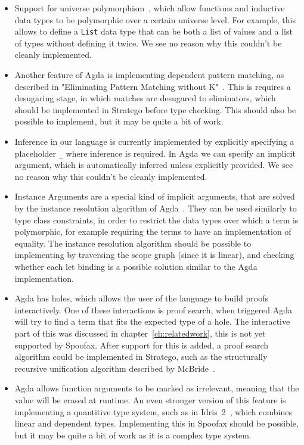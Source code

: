 \begin{itemize}
	\item Support for universe polymorphism~\cite[Universe Levels]{agda}, which allow functions and inductive data types to be polymorphic over a certain universe level. For example, this allows to define a \verb|List| data type that can be both a list of values and a list of types without defining it twice. We see no reason why this couldn't be cleanly implemented. 
	\item Another feature of Agda is implementing dependent pattern matching, as described in "Eliminating Pattern Matching without K"~\cite{patternmatching}. This is requires a desugaring stage, in which matches are desugared to eliminators, which should be implemented in Stratego before type checking. This should also be possible to implement, but it may be quite a bit of work.
	\item Inference in our language is currently implemented by explicitly specifying a placeholder \verb|_| where inference is required. In Agda we can specify an implicit argument, which is automatically inferred unless explicitly provided. We see no reason why this couldn't be cleanly implemented. 
	\item Instance Arguments are a special kind of implicit arguments, that are solved by the instance resolution algorithm of Agda~\cite[Instance Arguments]{agda}. They can be used similarly to type class constraints, in order to restrict the data types over which a term is polymorphic, for example requiring the terms to have an implementation of equality. The instance resolution algorithm should be possible to implementing by traversing the scope graph (since it is linear), and checking whether each let binding is a possible solution similar to the Agda implementation. 
	\item Agda has holes, which allows the user of the language to build proofs interactively. One of these interactions is proof search, when triggered Agda will try to find a term that fits the expected type of a hole. The interactive part of this was discussed in chapter~\ref{ch:relatedwork}, this is not yet supported by Spoofax. After support for this is added, a proof search algorithm could be implemented in Stratego, such as the structurally recursive unification algorithm described by McBride~\cite{proofsearch}.
	\item Agda allows function arguments to be marked as irrelevant, meaning that the value will be erased at runtime. An even stronger version of this feature is implementing a quantitive type system, such as in Idris~2~\cite{idris2}, which combines linear and dependent types. Implementing this in Spoofax should be possible, but it may be quite a bit of work as it is a complex type system.

\end{itemize}
